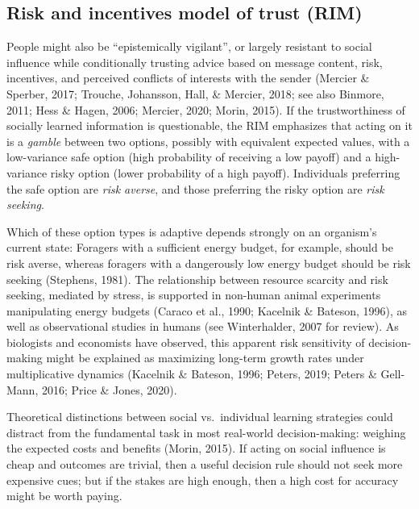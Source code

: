 \documentclass[
  11pt,
]{article}
\begin{document}
\hypertarget{risk-and-incentives-model-of-trust-rim}{%
\subsection{Risk and incentives model of trust
(RIM)}\label{risk-and-incentives-model-of-trust-rim}}

People might also be ``epistemically vigilant'', or largely resistant to
social influence while conditionally trusting advice based on message
content, risk, incentives, and perceived conflicts of interests with the
sender (Mercier \& Sperber, 2017; Trouche, Johansson, Hall, \& Mercier,
2018; see also Binmore, 2011; Hess \& Hagen, 2006; Mercier, 2020; Morin,
2015). If the trustworthiness of socially learned information is
questionable, the RIM emphasizes that acting on it is a \emph{gamble}
between two options, possibly with equivalent expected values, with a
low-variance safe option (high probability of receiving a low payoff)
and a high-variance risky option (lower probability of a high payoff).
Individuals preferring the safe option are \emph{risk averse}, and those
preferring the risky option are \emph{risk seeking}.

Which of these option types is adaptive depends strongly on an
organism's current state: Foragers with a sufficient energy budget, for
example, should be risk averse, whereas foragers with a dangerously low
energy budget should be risk seeking (Stephens, 1981). The relationship
between resource scarcity and risk seeking, mediated by stress, is
supported in non-human animal experiments manipulating energy budgets
(Caraco et al., 1990; Kacelnik \& Bateson, 1996), as well as
observational studies in humans (see Winterhalder, 2007 for review). As
biologists and economists have observed, this apparent risk sensitivity
of decision-making might be explained as maximizing long-term growth
rates under multiplicative dynamics (Kacelnik \& Bateson, 1996; Peters,
2019; Peters \& Gell-Mann, 2016; Price \& Jones, 2020).

Theoretical distinctions between social vs.~individual learning
strategies could distract from the fundamental task in most real-world
decision-making: weighing the expected costs and benefits (Morin, 2015).
If acting on social influence is cheap and outcomes are trivial, then a
useful decision rule should not seek more expensive cues; but if the
stakes are high enough, then a high cost for accuracy might be worth
paying.
\end{document}
